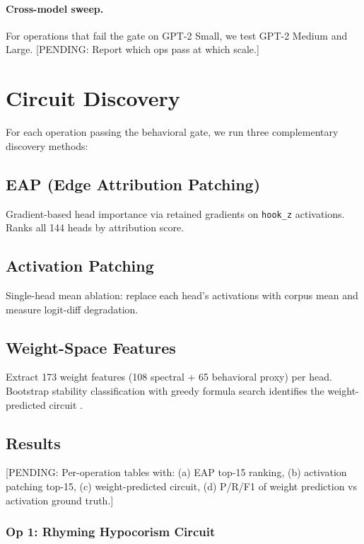 \documentclass{article}
\newcommand{\PENDING}[1]{{\color{blue}[PENDING: #1]}}
\begin{document}
\paragraph{Cross-model sweep.}
For operations that fail the gate on GPT-2 Small, we test GPT-2 Medium and
Large. \PENDING{Report which ops pass at which scale.}

\section{Circuit Discovery}

For each operation passing the behavioral gate, we run three complementary
discovery methods:

\subsection{EAP (Edge Attribution Patching)}

Gradient-based head importance via retained gradients on \texttt{hook\_z}
activations. Ranks all 144 heads by attribution score.

\subsection{Activation Patching}

Single-head mean ablation: replace each head's activations with corpus mean
and measure logit-diff degradation.

\subsection{Weight-Space Features}

Extract 173 weight features (108 spectral + 65 behavioral proxy) per head.
Bootstrap stability classification with greedy formula search identifies the
weight-predicted circuit \citep{tower2026weights}.

\subsection{Results}

\PENDING{Per-operation tables with: (a) EAP top-15 ranking, (b) activation
patching top-15, (c) weight-predicted circuit, (d) P/R/F1 of weight prediction
vs activation ground truth.}

\subsubsection{Op 1: Rhyming Hypocorism Circuit}
\end{document}
